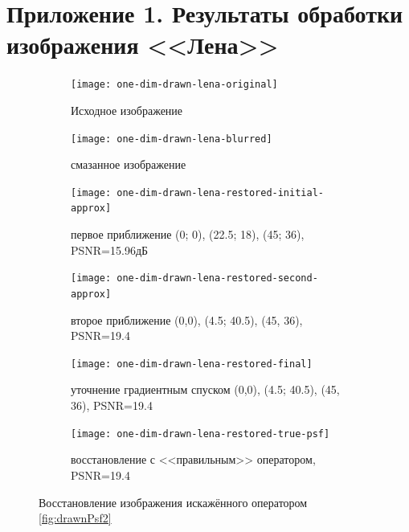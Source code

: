 \chapter*{Приложение 1. Результаты обработки изображения <<Лена>>}
\begin{figure}[h!]
	\centering
	\begin{subfigure}[t]{0.32\textwidth}
		\centering
		\texttt{[image: one-dim-drawn-lena-original]}
		\caption{Исходное изображение}
	\end{subfigure}
	\hfill
	\begin{subfigure}[t]{0.32\textwidth}
		\centering
		\texttt{[image: one-dim-drawn-lena-blurred]}
		\caption{смазанное изображение}
	\end{subfigure}
	\hfill
	\begin{subfigure}[t]{0.32\textwidth}
		\centering
		\texttt{[image: one-dim-drawn-lena-restored-initial-approx]}
		\caption{первое приближение (0; 0), (22.5; 18), (45; 36), PSNR=15.96дБ}
	\end{subfigure}
	\begin{subfigure}[t]{0.32\textwidth}
		\centering
		\texttt{[image: one-dim-drawn-lena-restored-second-approx]}
		\caption{второе приближение (0,0), (4.5; 40.5), (45, 36), PSNR=19.4}
	\end{subfigure}
	\hfill
	\begin{subfigure}[t]{0.32\textwidth}
		\centering
		\texttt{[image: one-dim-drawn-lena-restored-final]}
		\caption{уточнение градиентным спуском (0,0), (4.5; 40.5), (45, 36), PSNR=19.4}
	\end{subfigure}
	\hfill
	\begin{subfigure}[t]{0.32\textwidth}
		\centering
		\texttt{[image: one-dim-drawn-lena-restored-true-psf]}
		\caption{восстановление с <<правильным>> оператором, PSNR=19.4}
	\end{subfigure}
	\label{fig:oneDimDrawnLena}
	\caption{Восстановление изображения искажённого оператором \ref{fig:drawnPsf2}}
\end{figure}

